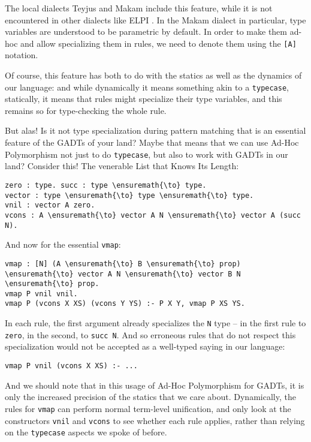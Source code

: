The local dialects Teyjus
\citep{teyjus-main-reference,teyjus-2-implementation} and Makam include
this feature, while it is not encountered in other dialects like ELPI
\citep{elpi-main-reference}. In the Makam dialect in particular, type
variables are understood to be parametric by default. In order to make
them ad-hoc and allow specializing them in rules, we need to denote them
using the \texttt{{[}A{]}} notation.

Of course, this feature has both to do with the statics as well as the
dynamics of our language: and while dynamically it means something akin
to a \texttt{typecase}, statically, it means that rules might specialize
their type variables, and this remains so for type-checking the whole
rule.

But alas! Is it not type specialization during pattern matching that is
an essential feature of the GADTs of your land? Maybe that means that we
can use Ad-Hoc Polymorphism not just to do \texttt{typecase}, but also
to work with GADTs in our land? Consider this! The venerable List that
Knows Its Length:

\begin{verbatim}
zero : type. succ : type \ensuremath{\to} type.
vector : type \ensuremath{\to} type \ensuremath{\to} type.
vnil : vector A zero.
vcons : A \ensuremath{\to} vector A N \ensuremath{\to} vector A (succ N).
\end{verbatim}

And now for the essential \texttt{vmap}:

\begin{verbatim}
vmap : [N] (A \ensuremath{\to} B \ensuremath{\to} prop) \ensuremath{\to} vector A N \ensuremath{\to} vector B N \ensuremath{\to} prop.
vmap P vnil vnil.
vmap P (vcons X XS) (vcons Y YS) :- P X Y, vmap P XS YS.
\end{verbatim}

In each rule, the first argument already specializes the \texttt{N} type
-- in the first rule to \texttt{zero}, in the second, to
\texttt{succ\ N}. And so erroneous rules that do not respect this
specialization would not be accepted as a well-typed saying in our
language:

\begin{verbatim}
vmap P vnil (vcons X XS) :- ...
\end{verbatim}

And we should note that in this usage of Ad-Hoc Polymorphism for GADTs,
it is only the increased precision of the statics that we care about.
Dynamically, the rules for \texttt{vmap} can perform normal term-level
unification, and only look at the constructors \texttt{vnil} and
\texttt{vcons} to see whether each rule applies, rather than relying on
the \texttt{typecase} aspects we spoke of before.

